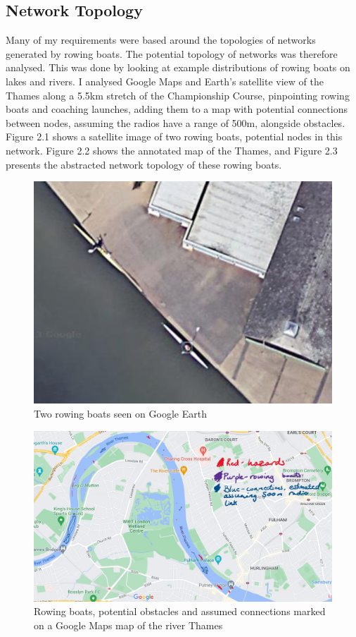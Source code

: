 \documentclass[12pt,a4paper]{report}
\begin{document}
\subsection{Network Topology}
Many of my requirements were based around the topologies of networks generated by rowing boats. The potential topology of networks was therefore analysed. This was done by looking at example distributions of rowing boats on lakes and rivers. I analysed Google Maps and Earth's satellite view of the Thames along a 5.5km stretch of the Championship Course, pinpointing rowing boats and coaching launches, adding them to a map with potential connections between nodes, assuming the radios have a range of 500m, alongside obstacles. Figure 2.1 shows a satellite image of two rowing boats, potential nodes in this network. Figure 2.2 shows the annotated map of the Thames, and Figure 2.3 presents the abstracted network topology of these rowing boats.
\begin{figure}[h]
\begin{center}
\includegraphics[scale=0.5]{earthSculler.jpg}
\end{center}
\caption{Two rowing boats seen on Google Earth \cite{earth}}
\end{figure}
\begin{figure}[h]
\begin{center}
\includegraphics[scale=0.4]{mapsmarked.jpg}
\end{center}
\caption{Rowing boats, potential obstacles and assumed connections marked on a Google Maps map of the river Thames \cite{googlemapsgeneral}}
\end{figure}
\end{document}
